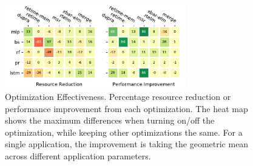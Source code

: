 \begin{figure}
\centering
\includegraphics[width=0.7\textwidth]{figs/heat.pdf}
\caption[Optimization Effectiveness]{
  Optimization Effectiveness. Percentage resource reduction or performance improvement from each
  optimization. The heat map shows the maximum differences when turning on/off the optimization, 
  while keeping other optimizations the same.
  For a single application, the improvement is taking the geometric mean across different application parameters.
}
\label{fig:reversehoisting}
\end{figure}

